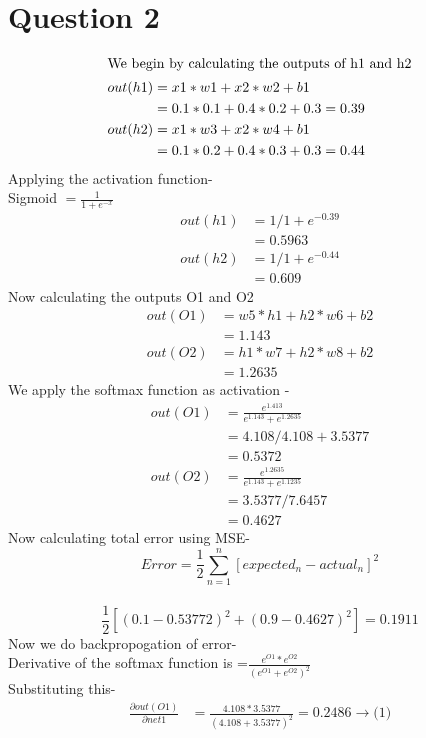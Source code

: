 \documentclass[12pt]{article}
\begin{document}
\section{Question 2}
\begin{align*}
\intertext{We begin by calculating the outputs of h1 and h2}
    out(h1) 
    &=x1 * w1 + x2 * w2 +b1 \\
    &=0.1*0.1+0.4*0.2+0.3=0.39 \\
    out(h2)
    &=x1 * w3 + x2 * w4 +b1 \\
    &=0.1*0.2+0.4*0.3+0.3=0.44
\end{align*}
Applying the activation function-\\
Sigmoid $=\frac{1}{1+e^{-x}} $\\
\begin{align*}
    out(h1)
    &=1/1+e^{-0.39} \\
    &=0.5963\\
    out(h2)
    &=1/1+e^{-0.44}\\
    &=0.609
\end{align*}
Now calculating the outputs O1 and O2 \\
\begin{align*}
    out(O1)
    &= w5*h1+h2*w6+b2 \\
    &=1.143\\
    out(O2)
    &= h1*w7+h2*w8+b2 \\
    &=1.2635 
\end{align*}
We apply the softmax function as activation -\\
\begin{align*}
    out(O1)
    &=\frac{e^{1.413}}{e^{1.143}+e^{1.2635}} \\
    &=4.108/4.108+3.5377\\
    &=0.5372\\
    out(O2)
    &=\frac{e^{1.2635}}{e^{1.143}+e^{1.1235}}\\
    &=3.5377/7.6457\\
    &=0.4627
\end{align*}
Now calculating total error using MSE-
\[Error=\frac{1}{2} \sum_{n=1}^{n} [expected_n-actual_n]^{2} \]\ 
\[\frac{1}{2}[(0.1-0.53772)^2 + (0.9-0.4627)^2]=0.1911 \]
Now we do backpropogation of error-\\
Derivative of the softmax function is =$\frac{e^{O1} * e^{O2}}{(e^{O1} + e^{O2})^{2}}$\\
Substituting this-
\begin{align*}
     \frac{\partial out(O1)}{\partial net1} &=\frac{4.108*3.5377}{(4.108+3.5377)^{2}}=0.2486 \longrightarrow \text{(1)}
 \end{align*}
\end{document}
